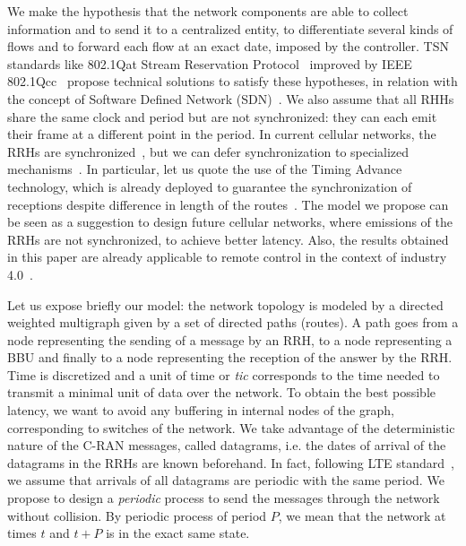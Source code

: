 \documentclass[a4paper,10pt]{journal}
\begin{document}
 We make the hypothesis that the network components are able to collect information and to send it to a centralized entity, to differentiate several kinds of flows and to forward each flow at an exact date, imposed by the controller. TSN standards like 802.1Qat Stream Reservation Protocol~\cite{ieee802qat} improved by IEEE 802.1Qcc~\cite{6755436} propose technical solutions to satisfy these hypotheses, in relation with the concept of Software Defined Network (SDN)~\cite{mohamed2021software,li2015software,7356556}.
We also assume that all RHHs share the same clock and period but are not synchronized: they can each emit their frame at a different point in the period.
In current cellular networks, the RRHs are synchronized~\cite{omri2019synchronization}, but we can defer synchronization to specialized mechanisms~\cite{khalili2016uplink,yemini2016multiple}. In particular, let us quote the use of the Timing Advance technology, which is already deployed to guarantee the synchronization of receptions despite difference in length of the routes~\cite{mahmood2019time}.
The model we propose can be seen as a suggestion to design future cellular networks, where emissions of the RRHs are not synchronized, to achieve better latency. 
Also, the results obtained in this paper are already applicable to remote control in the context of industry 4.0~\cite{peng2021latency,garcia2019latency}.

Let us expose briefly our model: the network topology is modeled by a directed weighted multigraph given by a set of directed paths (routes). A path goes from a node representing the sending of a message by an RRH, to a node representing a BBU and finally to a node representing the reception of the answer by the RRH. Time is discretized and a unit of time or \emph{tic} corresponds to the time needed to transmit a minimal unit of data over the network. To obtain the best possible latency, we want to avoid any buffering in internal nodes of the graph, corresponding to switches of the network. We take advantage of the deterministic nature of the C-RAN messages, called datagrams, i.e. the dates of arrival of the datagrams in the RRHs are known beforehand. In fact, following LTE standard~\cite{bouguen2012lte}, we assume that arrivals of all datagrams are periodic with the same period. We propose to design a \emph{periodic} process to send the messages through the network without collision. By periodic process of period $P$, we mean that the network at times $t$ and $t+P$ is in the exact same state. 
\end{document}

